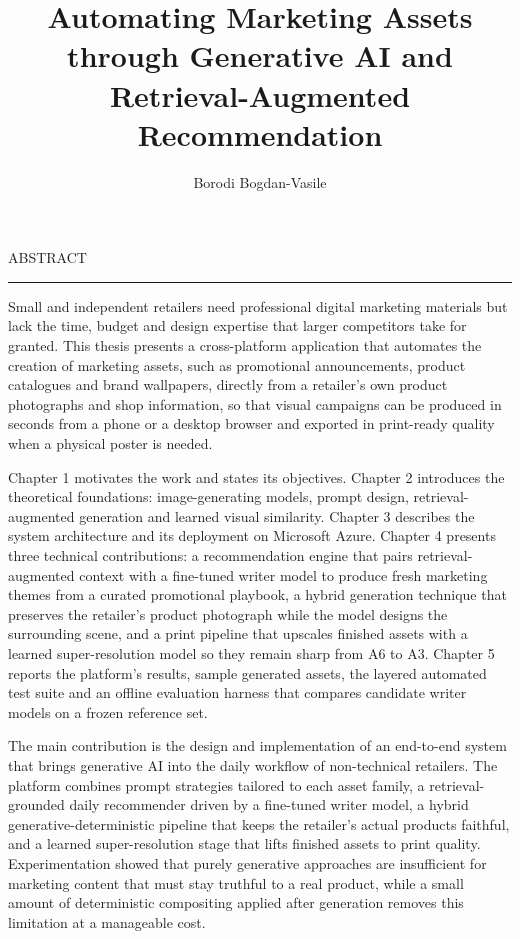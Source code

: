 \documentclass[12pt]{report}
\begin{document}
\title{Automating Marketing Assets through Generative AI and Retrieval-Augmented Recommendation}
\author{Borodi Bogdan-Vasile}

\maketitle


\newpage
\thispagestyle{empty}
\mbox{}
\newpage
{} 

\cleardoublepage
ABSTRACT
\vspace{0.5cm}	
\hrule
\vspace{0.5cm}	

Small and independent retailers need professional digital marketing materials but lack the time, budget and design expertise that larger competitors take for granted. This thesis presents a cross-platform application that automates the creation of marketing assets, such as promotional announcements, product catalogues and brand wallpapers, directly from a retailer's own product photographs and shop information, so that visual campaigns can be produced in seconds from a phone or a desktop browser and exported in print-ready quality when a physical poster is needed.

Chapter 1 motivates the work and states its objectives. Chapter 2 introduces the theoretical foundations: image-generating models, prompt design, retrieval-augmented generation and learned visual similarity. Chapter 3 describes the system architecture and its deployment on Microsoft Azure. Chapter 4 presents three technical contributions: a recommendation engine that pairs retrieval-augmented context with a fine-tuned writer model to produce fresh marketing themes from a curated promotional playbook, a hybrid generation technique that preserves the retailer's product photograph while the model designs the surrounding scene, and a print pipeline that upscales finished assets with a learned super-resolution model so they remain sharp from A6 to A3. Chapter 5 reports the platform's results, sample generated assets, the layered automated test suite and an offline evaluation harness that compares candidate writer models on a frozen reference set.

The main contribution is the design and implementation of an end-to-end system that brings generative AI into the daily workflow of non-technical retailers. The platform combines prompt strategies tailored to each asset family, a retrieval-grounded daily recommender driven by a fine-tuned writer model, a hybrid generative-deterministic pipeline that keeps the retailer's actual products faithful, and a learned super-resolution stage that lifts finished assets to print quality. Experimentation showed that purely generative approaches are insufficient for marketing content that must stay truthful to a real product, while a small amount of deterministic compositing applied after generation removes this limitation at a manageable cost.
\end{document}

